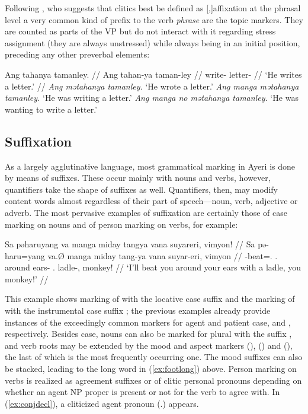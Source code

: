 Following \citet{klavans1985}, who suggests that clitics best be defined as 
[,]{affixation at the phrasal level} a very common 
kind of prefix to the verb \emph{phrase} are the topic markers. They are counted 
as parts of the VP but do not interact with it regarding stress assignment (they 
are always unstressed) while always being in an initial position, preceding any 
other preverbal elements:

\pex
	\a\begingl
		\gla Ang tahanya tamanley. //
		\glb Ang tahan-ya taman-ley //
		\glc \AgtT{} write-\TsgM{} letter-\PargI{} //
		\glft `He writes a letter.' //
	\endgl
	\a \textit{Ang mətahanya tamanley.} `He wrote a letter.'
	\a \textit{Ang manga mətahanya tamanley.} `He was writing a letter.'
	\a \textit{Ang manga no mətahanya tamanley.} `He was wanting to write a 
		letter.'
\xe



\subsection{Suffixation}

As a largely agglutinative language, most grammatical marking in Ayeri is done 
by means of suffixes. These occur mainly with nouns and verbs, however, 
quantifiers take the shape of suffixes as well. Quantifiers, then, may modify 
content words almost regardless of their part of speech---noun, verb, adjective 
or adverb. The most pervasive examples of suffixation are certainly those of 
case marking on nouns and of person marking on verbs, for example:

\ex\label{ex:conjdecl}\begingl
	\gla Sa pəharuyang va manga miday tangya vana suyareri, vimyon! //
	\glb Sa pə-haru=yang va.Ø manga miday tang-ya vana suyar-eri, vimyon //
	\glc \PatT{} \NFut{}-beat=\Fsg{}.\Aarg{} \Ssg{}.\Top{} \Dyn{} around 
		ears-\Loc{} \Ssg{}.\Gen{} ladle-\Ins{}, monkey! //
	\glft `I'll beat you around your ears with a ladle, you monkey!' //
\endgl\xe

This example shows marking of  with the locative case 
suffix  and the marking of  with the 
instrumental case suffix ; the previous examples already 
provide instances of the exceedingly common markers for agent and patient 
case,  and , respectively. Besides case, nouns 
can also be marked for plural with the suffix , and verb roots 
may be extended by the mood and aspect markers  (\Irr{}), 
 (\Hab{}) and  (\Neg{}), the last of which is 
the most frequently occurring one. The mood suffixes can also be stacked, 
leading to the long word in (\ref{ex:footlong}) above. Person marking on verbs 
is realized as agreement suffixes or of clitic personal pronouns depending on 
whether an agent NP proper is present or not for the verb to agree with. In 
(\ref{ex:conjdecl}), a cliticized agent pronoun  
(\TsgM{}.\Aarg{}) appears.

